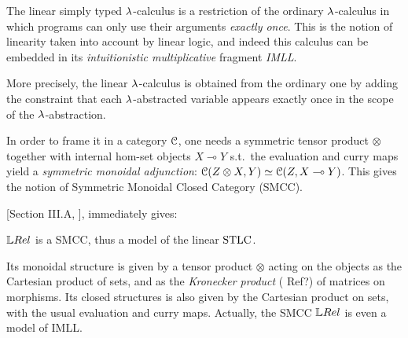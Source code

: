 The linear simply typed $\lambda$-calculus is a restriction of the ordinary $\lambda$-calculus in which programs can only use their arguments \emph{exactly once}.
This is the notion of linearity taken into account by linear logic, and indeed this calculus can be embedded in its \emph{intuitionistic multiplicative} fragment \emph{IMLL}.

More precisely, the linear $\lambda$-calculus is obtained from the ordinary one by adding the constraint that each $\lambda$-abstracted variable appears exactly once in the scope of the $\lambda$-abstraction.

In order to frame it in a category $\mathcal{C}$, one needs a symmetric tensor product $\otimes$ together with internal hom-set objects $X\multimap Y$ s.t.\ the evaluation and curry maps yield a \emph{symmetric monoidal adjunction}: $\mathcal{C}(Z\otimes X, Y) \simeq \mathcal{C} (Z, X\multimap Y)$.
This gives the notion of Symmetric Monoidal Closed Category (SMCC).

[Section III.A, \cite{Manzo2013}], immediately gives:

\begin{fact}\label{fact:LREL_SMCC}
 $\LREL$ is a SMCC, thus a model of the linear $\mathrm{STLC}$.
\end{fact}

Its monoidal structure is given by a tensor product $\otimes$ acting on the objects as the Cartesian product of sets, and as the \emph{Kronecker product} {(\color{red} Ref?)} of matrices on morphisms.
Its closed structures is also given by the Cartesian product on sets, with the usual evaluation and curry maps.
Actually, the SMCC $\LREL$ is even a model of IMLL.
